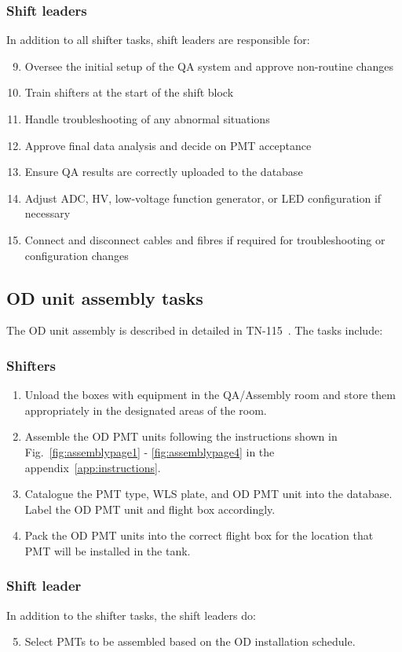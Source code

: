 \documentclass[12pt,a4paper]{article}
\begin{document}
\subsubsection*{Shift leaders}
In addition to all shifter tasks, shift leaders are responsible for:
\begin{enumerate}
    \setcounter{enumi}{8}
    \item Oversee the initial setup of the QA system and approve non-routine changes
    \item Train shifters at the start of the shift block
    \item Handle troubleshooting of any abnormal situations
    \item Approve final data analysis and decide on PMT acceptance
    \item Ensure QA results are correctly uploaded to the database
    \item Adjust ADC, HV, low-voltage function generator, or LED configuration if necessary
    \item Connect and disconnect cables and fibres if required for troubleshooting or configuration changes
\end{enumerate}


\subsection{OD unit assembly tasks}
The OD unit assembly is described in detailed in TN-115~\cite{ODAssemblyTN}. The tasks include:
\subsubsection*{Shifters}
\begin{enumerate}
    \item Unload the boxes with equipment in the QA/Assembly room and store them appropriately in the designated areas of the room.
    \item Assemble the OD PMT units following the instructions shown in Fig.~\ref{fig:assemblypage1} - \ref{fig:assemblypage4} in the appendix~\ref{app:instructions}. 
    \item Catalogue the PMT type, WLS plate, and OD PMT unit into the database. Label the OD PMT unit and flight box accordingly.
    \item Pack the OD PMT units into the correct flight box for the location that PMT will be installed in the tank.
\end{enumerate}

\subsubsection*{Shift leader}
In addition to the shifter tasks, the shift leaders do:
\begin{enumerate}
    \setcounter{enumi}{4}
    \item Select PMTs to be assembled based on the OD installation schedule.
\end{enumerate}
\end{document}
